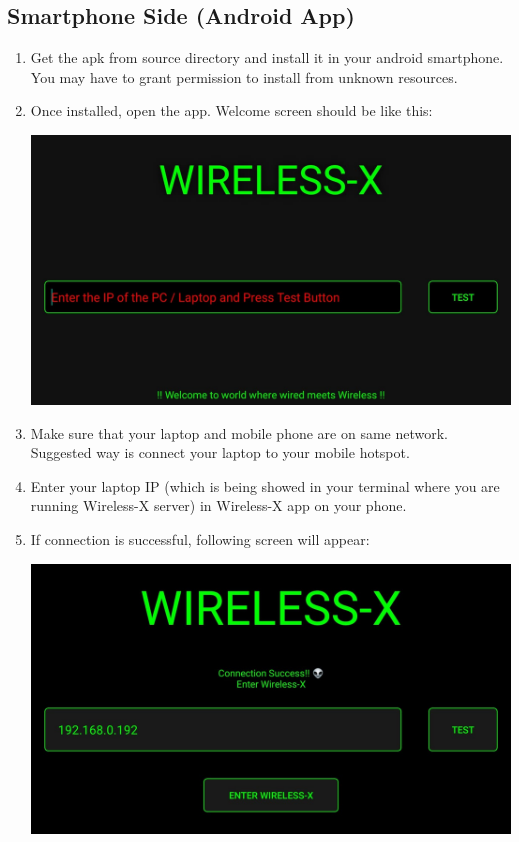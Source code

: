 \documentclass[12pt, letterpaper]{article}
\begin{document}
\subsection{Smartphone Side (Android App)}
\begin{enumerate}
\item Get the apk from source directory and install it in your android smartphone. You may have to grant permission to install from unknown resources. 
\item Once installed, open the app. Welcome screen should be like this:
\begin{center}
    \includegraphics[scale=0.25]{images/welcomeScreen.jpeg}
\end{center}
\item Make sure that your laptop and mobile phone are on same network. Suggested way is connect your laptop to your mobile hotspot.
\item Enter your laptop IP (which is being showed in your terminal where you are running Wireless-X server) in Wireless-X app on your phone. 
\item If connection is successful, following screen will appear:
\begin{center}
    \includegraphics[scale=0.25]{images/connectionSuccessful.jpeg}

\end{center}
\end{enumerate}
\end{document}
